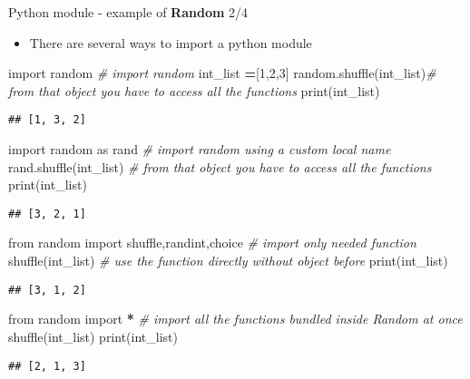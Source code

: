 \documentclass[
  8pt,
  ignorenonframetext,
]{beamer}
\newenvironment{Shaded}{\begin{snugshade}}{\end{snugshade}}
\newcommand{\BuiltInTok}[1]{#1}
\newcommand{\CommentTok}[1]{\textcolor[rgb]{0.56,0.35,0.01}{\textit{#1}}}
\newcommand{\DecValTok}[1]{\textcolor[rgb]{0.00,0.00,0.81}{#1}}
\newcommand{\ImportTok}[1]{#1}
\newcommand{\NormalTok}[1]{#1}
\newcommand{\OperatorTok}[1]{\textcolor[rgb]{0.81,0.36,0.00}{\textbf{#1}}}
\providecommand{\tightlist}{%
  \setlength{\itemsep}{0pt}\setlength{\parskip}{0pt}}
\begin{document}
\begin{frame}[fragile]{Python module - example of \textbf{Random} 2/4}
\protect\hypertarget{python-module---example-of-random-24}{}
\begin{itemize}
\tightlist
\item
  There are several ways to import a python module
\end{itemize}

\begin{Shaded}
\begin{Highlighting}[]
\ImportTok{import}\NormalTok{ random }\CommentTok{\# import random}
\NormalTok{int\_list }\OperatorTok{=}\NormalTok{[}\DecValTok{1}\NormalTok{,}\DecValTok{2}\NormalTok{,}\DecValTok{3}\NormalTok{]}
\NormalTok{random.shuffle(int\_list)}\CommentTok{\# from that object you have to access all the functions}
\BuiltInTok{print}\NormalTok{(int\_list)}
\end{Highlighting}
\end{Shaded}

\begin{verbatim}
## [1, 3, 2]
\end{verbatim}

\begin{Shaded}
\begin{Highlighting}[]
\ImportTok{import}\NormalTok{ random }\ImportTok{as}\NormalTok{ rand }\CommentTok{\# import random using a custom local name }
\NormalTok{rand.shuffle(int\_list) }\CommentTok{\# from that object you have to access all the functions}
\BuiltInTok{print}\NormalTok{(int\_list)}
\end{Highlighting}
\end{Shaded}

\begin{verbatim}
## [3, 2, 1]
\end{verbatim}

\begin{Shaded}
\begin{Highlighting}[]
\ImportTok{from}\NormalTok{ random }\ImportTok{import}\NormalTok{ shuffle,randint,choice }\CommentTok{\# import only needed function}
\NormalTok{shuffle(int\_list) }\CommentTok{\# use the function directly without object before}
\BuiltInTok{print}\NormalTok{(int\_list)}
\end{Highlighting}
\end{Shaded}

\begin{verbatim}
## [3, 1, 2]
\end{verbatim}

\begin{Shaded}
\begin{Highlighting}[]
\ImportTok{from}\NormalTok{ random }\ImportTok{import} \OperatorTok{*} \CommentTok{\# import all the functions bundled inside Random at once}
\NormalTok{shuffle(int\_list)}
\BuiltInTok{print}\NormalTok{(int\_list)}
\end{Highlighting}
\end{Shaded}

\begin{verbatim}
## [2, 1, 3]
\end{verbatim}
\end{frame}
\end{document}
